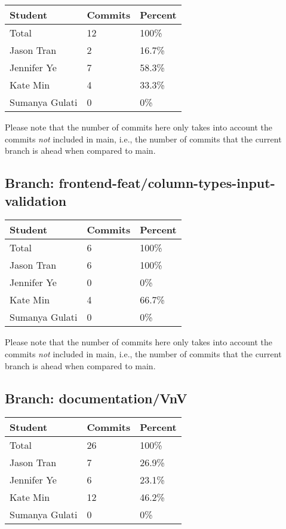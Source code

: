 \documentclass{article}
\begin{document}
\begin{table}[H]
\centering
\begin{tabular}{lll}
\toprule
\textbf{Student} & \textbf{Commits} & \textbf{Percent}\\
\midrule
Total & 12 & 100\% \\
Jason Tran & 2 & 16.7\% \\
Jennifer Ye & 7 & 58.3\% \\
Kate Min & 4 & 33.3\% \\
Sumanya Gulati & 0 & 0\% \\
\bottomrule
\end{tabular}
\end{table}

Please note that the number of commits here only takes into account the commits \emph{not}
included in main, i.e., the number of commits that the current branch is ahead when compared 
to main.

\subsection{Branch: frontend-feat/column-types-input-validation}

\begin{table}[H]
\centering
\begin{tabular}{lll}
\toprule
\textbf{Student} & \textbf{Commits} & \textbf{Percent}\\
\midrule
Total & 6 & 100\% \\
Jason Tran & 6 & 100\% \\
Jennifer Ye & 0 & 0\% \\
Kate Min & 4 & 66.7\% \\
Sumanya Gulati & 0 & 0\% \\
\bottomrule
\end{tabular}
\end{table}

Please note that the number of commits here only takes into account the commits \emph{not}
included in main, i.e., the number of commits that the current branch is ahead when compared 
to main.

\subsection{Branch: documentation/VnV}

\begin{table}[H]
\centering
\begin{tabular}{lll}
\toprule
\textbf{Student} & \textbf{Commits} & \textbf{Percent}\\
\midrule
Total & 26 & 100\% \\
Jason Tran & 7 & 26.9\% \\
Jennifer Ye & 6 & 23.1\% \\
Kate Min & 12 & 46.2\% \\
Sumanya Gulati & 0 & 0\% \\
\bottomrule
\end{tabular}
\end{table}
\end{document}
